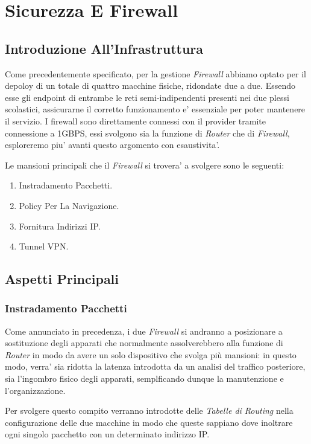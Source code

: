 \documentclass{report}
\begin{document}
    \chapter{Sicurezza E Firewall}
        \author{Serena Thomas}
        \section{Introduzione All'Infrastruttura}
        Come precedentemente specificato, per la gestione \emph{Firewall} abbiamo optato per il depoloy di un totale di
         quattro macchine fisiche, ridondate due a due. Essendo esse gli endpoint di entrambe le reti semi-indipendenti 
         presenti nei due plessi scolastici, assicurarne il corretto funzionamento e' essenziale per poter mantenere
         il servizio.
        I firewall sono direttamente connessi con il provider tramite connessione a 1GBPS, essi svolgono sia la funzione 
         di \emph{Router} che di \emph{Firewall}, esploreremo piu' avanti questo argomento con esaustivita'.

        Le mansioni principali che il \emph{Firewall} si trovera' a svolgere sono le seguenti:
        \begin{enumerate}
            \item Instradamento Pacchetti.
            \item Policy Per La Navigazione.
            \item Fornitura Indirizzi IP.
            \item Tunnel VPN.
        \end{enumerate}
        \section{Aspetti Principali}
        \subsection{Instradamento Pacchetti}
            Come annunciato in precedenza, i due \emph{Firewall} si andranno a posizionare a sostituzione degli apparati
             che normalmente assolverebbero alla funzione di \emph{Router} in modo da avere un solo dispositivo che svolga
             più mansioni: in questo modo, verra' sia ridotta la latenza introdotta da un analisi del traffico posteriore,
             sia l'ingombro fisico degli apparati, semplficando dunque la manutenzione e l'organizzazione.

             Per svolgere questo compito verranno introdotte delle \emph{Tabelle di Routing} nella configurazione delle due
             macchine in modo che queste sappiano dove inoltrare ogni singolo pacchetto con un determinato indirizzo IP.
\end{document}
